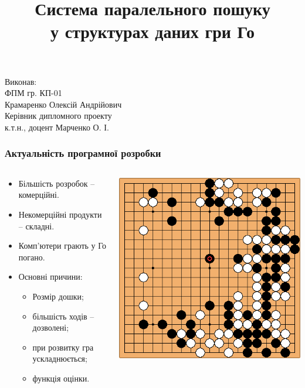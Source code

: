\documentclass{beamer}
\title[Пошук у структурах даних гри Го]{Система паралельного пошуку \\ у структурах даних гри Го}
\date{}
\begin{document}
\begin{frame}
\titlepage

\hfill Виконав: \\
 ФПМ гр. КП-01 \\
\hfill Крамаренко Олексій Андрійович \\
\hfill Керівник дипломного проекту \\
\hfill к.т.н., доцент Марченко О. І.

\end{frame}

\begin{frame}
    \frametitle{Актуальність програмної розробки}
    \begin{columns}
    \begin{column}{0.5\textwidth}
        \begin{itemize}
        \item Більшість розробок -- комерційні.
        \item Некомерційні продукти -- складні.
        \item Комп'ютери грають у Го погано.
        \item Основні причини:
        \begin{itemize}
            \item Розмір дошки;
            \item більшість ходів -- дозволені;
            \item при розвитку гра ускладнюється;
            \item функція оцінки.
        \end{itemize}
    \end{itemize}
    \end{column}
    \begin{column}{0.5\textwidth}
        \hfill\includegraphics[height=0.6\paperheight]{game-board.png}
    \end{column}
    \end{columns}


\end{frame}
\end{document}
